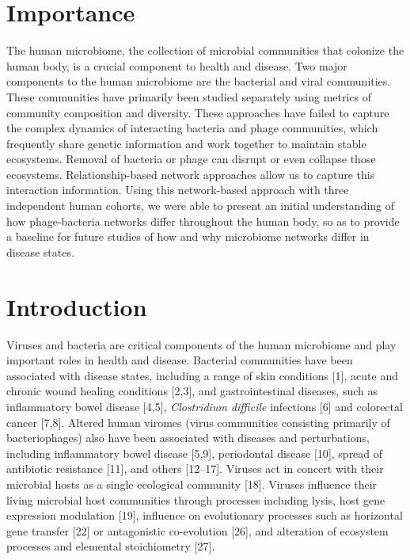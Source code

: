 \documentclass[12pt,]{article}
\begin{document}
\newpage

\section{Importance}\label{importance}

The human microbiome, the collection of microbial communities that
colonize the human body, is a crucial component to health and disease.
Two major components to the human microbiome are the bacterial and viral
communities. These communities have primarily been studied separately
using metrics of community composition and diversity. These approaches
have failed to capture the complex dynamics of interacting bacteria and
phage communities, which frequently share genetic information and work
together to maintain stable ecosystems. Removal of bacteria or phage can
disrupt or even collapse those ecosystems. Relationship-based network
approaches allow us to capture this interaction information. Using this
network-based approach with three independent human cohorts, we were
able to present an initial understanding of how phage-bacteria networks
differ throughout the human body, so as to provide a baseline for future
studies of how and why microbiome networks differ in disease states.

\newpage

\section{Introduction}\label{introduction}

Viruses and bacteria are critical components of the human microbiome and
play important roles in health and disease. Bacterial communities have
been associated with disease states, including a range of skin
conditions {[}1{]}, acute and chronic wound healing conditions
{[}2,3{]}, and gastrointestinal diseases, such as inflammatory bowel
disease {[}4,5{]}, \emph{Clostridium difficile} infections {[}6{]} and
colorectal cancer {[}7,8{]}. Altered human viromes (virus communities
consisting primarily of bacteriophages) also have been associated with
diseases and perturbations, including inflammatory bowel disease
{[}5,9{]}, periodontal disease {[}10{]}, spread of antibiotic resistance
{[}11{]}, and others {[}12--17{]}. Viruses act in concert with their
microbial hosts as a single ecological community {[}18{]}. Viruses
influence their living microbial host communities through processes
including lysis, host gene expression modulation {[}19{]}, influence on
evolutionary processes such as horizontal gene transfer {[}22{]} or
antagonistic co-evolution {[}26{]}, and alteration of ecosystem
processes and elemental stoichiometry {[}27{]}.
\end{document}
